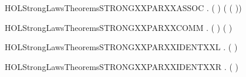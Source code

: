 \newcommand{\HOLStrongLawsTheoremsSTRONGXXLEFTXXSUMXXMIDXXIDEMP}{\UseVerbatim{HOLStrongLawsTheoremsSTRONGXXLEFTXXSUMXXMIDXXIDEMP}}
\begin{SaveVerbatim}{HOLStrongLawsTheoremsSTRONGXXPARXXASSOC}
\HOLTokenTurnstile{} \HOLSymConst{\HOLTokenForall{}}  .  ( \HOLSymConst{\ensuremath{\parallel}}  \HOLSymConst{\ensuremath{\parallel}} ) ( \HOLSymConst{\ensuremath{\parallel}} ( \HOLSymConst{\ensuremath{\parallel}} ))
\end{SaveVerbatim}
\newcommand{\HOLStrongLawsTheoremsSTRONGXXPARXXASSOC}{\UseVerbatim{HOLStrongLawsTheoremsSTRONGXXPARXXASSOC}}
\begin{SaveVerbatim}{HOLStrongLawsTheoremsSTRONGXXPARXXCOMM}
\HOLTokenTurnstile{} \HOLSymConst{\HOLTokenForall{}} .  ( \HOLSymConst{\ensuremath{\parallel}} ) ( \HOLSymConst{\ensuremath{\parallel}} )
\end{SaveVerbatim}
\newcommand{\HOLStrongLawsTheoremsSTRONGXXPARXXCOMM}{\UseVerbatim{HOLStrongLawsTheoremsSTRONGXXPARXXCOMM}}
\begin{SaveVerbatim}{HOLStrongLawsTheoremsSTRONGXXPARXXIDENTXXL}
\HOLTokenTurnstile{} \HOLSymConst{\HOLTokenForall{}}.  ( \HOLSymConst{\ensuremath{\parallel}} ) 
\end{SaveVerbatim}
\newcommand{\HOLStrongLawsTheoremsSTRONGXXPARXXIDENTXXL}{\UseVerbatim{HOLStrongLawsTheoremsSTRONGXXPARXXIDENTXXL}}
\begin{SaveVerbatim}{HOLStrongLawsTheoremsSTRONGXXPARXXIDENTXXR}
\HOLTokenTurnstile{} \HOLSymConst{\HOLTokenForall{}}.  ( \HOLSymConst{\ensuremath{\parallel}} ) 
\end{SaveVerbatim}
\newcommand{\HOLStrongLawsTheoremsSTRONGXXPARXXIDENTXXR}{\UseVerbatim{HOLStrongLawsTheoremsSTRONGXXPARXXIDENTXXR}}
